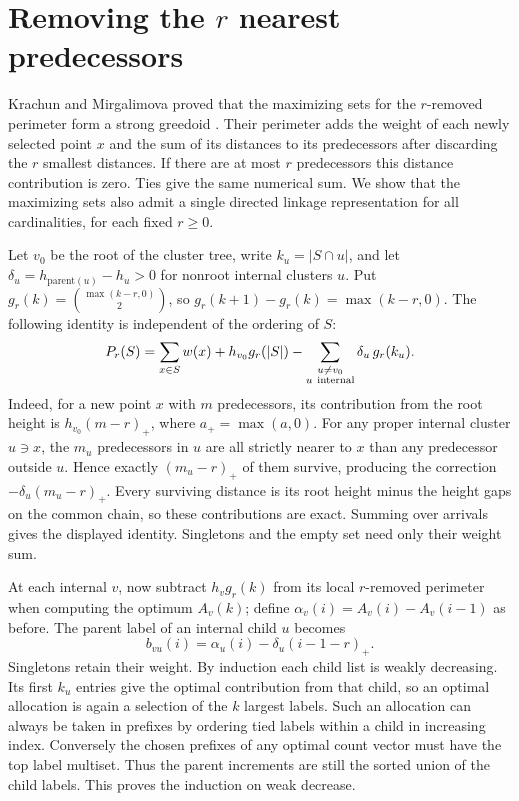\documentclass[11pt,a4paper]{article}
\begin{document}
\section[Removing the r nearest predecessors]{Removing the \(r\) nearest predecessors}
\label{sec:removed}
Krachun and Mirgalimova proved that the maximizing sets for the
\(r\)-removed perimeter form a strong greedoid
\cite[Definitions~2--3, 11 and Theorem~19]{removed}.
Their perimeter adds the weight of each newly selected point \(x\) and
the sum of its distances to its predecessors after discarding the \(r\)
smallest distances. If there are at most \(r\) predecessors this
distance contribution is zero. Ties give the same numerical sum.
We show that the maximizing sets also admit a single directed
linkage representation for all cardinalities, for each fixed \(r\ge0\).

Let \(v_0\) be the root of the cluster tree, write \(k_u=|S\cap u|\),
and let \(\delta_u=h_{\mathrm{parent}(u)}-h_u>0\) for nonroot internal
clusters \(u\). Put \(g_r(k)=\binom{\max(k-r,0)}{2}\), so
\(g_r(k+1)-g_r(k)=\max(k-r,0)\).
The following identity is independent of the ordering of \(S\):
\[
 P_r(S)=\sum_{x\in S}w(x)+h_{v_0}g_r(|S|)
           -\sum_{\substack{u\ne v_0\\u\ {\rm internal}}}
                           \delta_u\,g_r(k_u).
\]
Indeed, for a new point \(x\) with \(m\) predecessors, its contribution
from the root height is \(h_{v_0}(m-r)_+\), where \(a_+=\max(a,0)\).
For any proper internal cluster \(u\ni x\), the \(m_u\) predecessors in
\(u\) are all strictly nearer to \(x\) than any predecessor outside \(u\).
Hence exactly \((m_u-r)_+\) of them survive, producing the correction
\(-\delta_u(m_u-r)_+\). Every surviving distance is its root height minus
the height gaps on the common chain, so these contributions are exact.
Summing over arrivals gives the displayed identity. Singletons and the
empty set need only their weight sum.

At each internal \(v\), now subtract \(h_v g_r(k)\) from its local
\(r\)-removed perimeter when computing the optimum \(A_v(k)\); define
\(\alpha_v(i)=A_v(i)-A_v(i-1)\) as before. The parent label of an
internal child \(u\) becomes
\[
 b_{vu}(i)=\alpha_u(i)-\delta_u(i-1-r)_+.
\]
Singletons retain their weight. By induction each child list is weakly
decreasing. Its first \(k_u\) entries give the optimal contribution from
that child, so an optimal allocation is again a selection of the \(k\)
largest labels. Such an allocation can always be taken in prefixes by
ordering tied labels within a child in increasing index. Conversely the
chosen prefixes of any optimal count vector must have the top label
multiset. Thus the parent increments are still the sorted union of the
child labels. This proves the induction on weak decrease.
\end{document}
